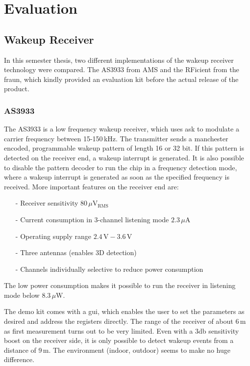\chapter{Evaluation}

\section{Wakeup Receiver}
In this semester thesis, two different implementations of the wakeup receiver technology were compared.
The AS3933 from AMS and the RFicient from the \acf{fraun}, which kindly provided an evaluation kit before the actual release of the product.

\subsection{AS3933}
The AS3933 is a low frequency wakeup receiver, which uses \acs{ask} to modulate a carrier frequency between 15-150\,kHz.
The transmitter sends a manchester encoded, programmable wakeup pattern of length 16 or 32 bit.
If this pattern is detected on the receiver end, a wakeup interrupt is generated.
It is also possible to disable the pattern decoder to run the chip in a frequency detection mode, where a wakeup interrupt is generated as soon as the specified frequency is received.
More important features on the receiver end are:
\begin{itemize}
	\item[-] Receiver sensitivity $80\,\mu\text{V$_{\text{RMS}}$}$
	\item[-] Current consumption in 3-channel listening mode $2.3\,\mu\text{A}$
	\item[-] Operating supply range $2.4\,\text{V}-3.6\,\text{V}$
	\item[-] Three antennas (enables 3D detection)
	\item[-] Channels  individually selective to reduce power consumption
\end{itemize}
The low power consumption makes it possible to run the receiver in listening mode below $8.3\,\mu\text{W}$\cite{as3933}.

The demo kit comes with a \acs{gui}, which enables the user to set the parameters as desired and address the registers directly.
The range of the receiver of about 6\,m as first measurement turns out to be very limited.
Even with a 3db sensitivity boost on the receiver side, it is only possible to detect wakeup events from a distance of 9\,m.
The environment (indoor, outdoor) seems to make no huge difference.

